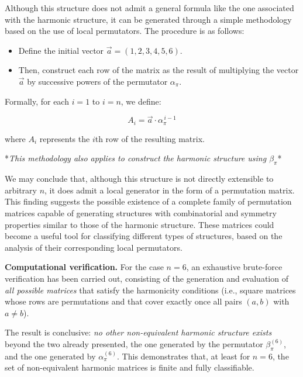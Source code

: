 \documentclass{article}
\begin{document}
Although this structure does not admit a general formula like the one associated with the harmonic structure, it can be generated through a simple methodology based on the use of local permutators. The procedure is as follows:

\begin{itemize}
    \item Define the initial vector \(\vec{a} = (1, 2, 3, 4, 5, 6)\).
    \item Then, construct each row of the matrix as the result of multiplying the vector \(\vec{a}\) by successive powers of the permutator \(\alpha_\pi\).
\end{itemize}

Formally, for each \(i = 1\) to \(i = n\), we define:

\[
A_i = \vec{a} \cdot \alpha_\pi^{\,i-1}
\]

where \(A_i\) represents the \(i\)th row of the resulting matrix.


*\textit{This methodology also applies to construct the harmonic structure using \(\beta_\pi\)}*

\vspace{0.3cm}

We may conclude that, although this structure is not directly extensible to arbitrary \(n\), it does admit a local generator in the form of a permutation matrix. This finding suggests the possible existence of a complete family of permutation matrices capable of generating structures with combinatorial and symmetry properties similar to those of the harmonic structure. These matrices could become a useful tool for classifying different types of structures, based on the analysis of their corresponding local permutators.

\vspace{0.3cm}

\noindent
\textbf{Computational verification.}  
For the case \(n = 6\), an exhaustive brute-force verification has been carried out, consisting of the generation and evaluation of \emph{all possible matrices} that satisfy the harmonicity conditions (i.e., square matrices whose rows are permutations and that cover exactly once all pairs \((a,b)\) with \(a \ne b\)).

The result is conclusive: \emph{no other non-equivalent harmonic structure exists} beyond the two already presented, the one generated by the permutator \(\beta_\pi^{(6)}\), and the one generated by \(\alpha_\pi^{(6)}\).  
This demonstrates that, at least for \(n = 6\), the set of non-equivalent harmonic matrices is finite and fully classifiable.
\end{document}

